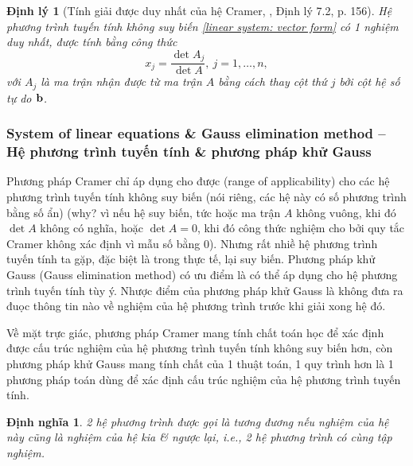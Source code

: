 \documentclass{article}
\newtheorem{dinhly}{Định lý}
\newtheorem{dinhnghia}{Định nghĩa}
\begin{document}
\begin{dinhly}[Tính giải được duy nhất của hệ Cramer, \cite{Hung_linear_algebra}, Định lý 7.2, p. 156]
	Hệ phương trình tuyến tính không suy biến \eqref{linear system: vector form} có 1 nghiệm duy nhất, được tính bằng công thức
	\begin{equation*}
		x_j = \frac{\det A_j}{\det A},\ j = 1,\ldots,n,
	\end{equation*}
	với $A_j$ là ma trận nhận được từ ma trận $A$ bằng cách thay cột thứ $j$ bởi cột hệ số tự do ${\bf b}$.
\end{dinhly}


\subsubsection{System of linear equations \& Gauss elimination method -- Hệ phương trình tuyến tính \& phương pháp khử Gauss}
Phương pháp Cramer chỉ áp dụng cho được (range of applicability) cho các hệ phương trình tuyến tính không suy biến (nói riêng, các hệ này có số phương trình bằng số ẩn) (why? vì nếu hệ suy biến, tức hoặc ma trận $A$ không vuông, khi đó $\det A$ không có nghĩa, hoặc $\det A = 0$, khi đó công thức nghiệm cho bởi quy tắc Cramer không xác định vì mẫu số bằng 0). Nhưng rất nhiề hệ phương trình tuyến tính ta gặp, đặc biệt là trong thực tế, lại suy biến. Phương pháp khử Gauss (Gauss elimination method) có ưu điểm là có thể áp dụng cho hệ phương trình tuyến tính tùy ý. Nhược điểm của phương pháp khử Gauss là không đưa ra đuọc thông tin nào về nghiệm của hệ phương trình trước khi giải xong hệ đó.

Về mặt trực giác, phương pháp Cramer mang tính chất toán học để xác định được cấu trúc nghiệm của hệ phương trình tuyến tính không suy biến hơn, còn phương pháp khử Gauss mang tính chất của 1 thuật toán, 1 quy trình hơn là 1 phương pháp toán dùng để xác định cấu trúc nghiệm của hệ phương trình tuyến tính.

\begin{dinhnghia}
	2 hệ phương trình được gọi là {\rm tương đương} nếu nghiệm của hệ này cũng là nghiệm của hệ kia \& ngược lại, i.e., 2 hệ phương trình có cùng tập nghiệm.
\end{dinhnghia}
\end{document}
